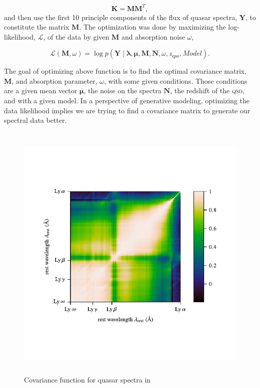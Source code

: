 \documentclass{ar-1col}
\begin{document}
\begin{equation}
    \mathbf{K} = \mathbf{M}\mathbf{M}^{T},
    \label{eq:decompose}
\end{equation}
and then use the first 10 principle components of the flux of quasar spectra, $\mathbf{Y}$, to constitute the matrix $\mathbf{M}$. 
The optimization was done by maximizing the log-likelihood, $\mathcal{L}$, of the data by given $\mathbf{M}$ and absorption noise $\omega$, 

\begin{equation}
    \mathcal{L}(\mathbf{M}, \omega) = \log{ p(\mathbf{Y} \mid \mathbf{\lambda}, \mathbf{\mu}, \mathbf{M}, \mathbf{N}, \omega, z_\mathrm{qso}, Model) }.
\end{equation}

The goal of optimizing above function is to find the optimal covariance matrix, $\mathbf{M}$, and absorption parameter, $\omega$, with some given conditions. Those conditions are a given mean vector $\mathbf{\mu}$, the noise on the spectra $\mathbf{N}$, the redshift of the \textsc{qso}, and with a given model. 
In a perspective of generative modeling, optimizing the data likelihood implies we are trying to find a covariance matrix to generate our spectral data better. 

\begin{figure}
    \includegraphics[width=5in, height=5in]{images/covariance.pdf}
    \caption{Covariance function for quasar spectra in \citet{Garnett17}}
    \label{fig:covariance}
\end{figure}
\end{document}
